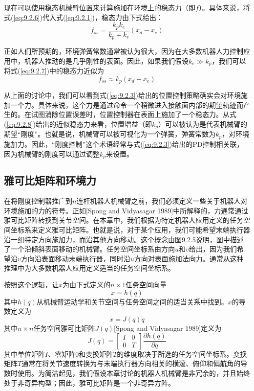 \documentclass[12pt,a4paper]{ctexart}
\begin{document}
现在可以使用稳态机械臂位置来计算施加在环境上的稳态力（即$f$）。具体来说，将式(\ref{eq:9.2.6})代入式(\ref{eq:9.2.1})，稳态力由下式给出：
\begin{equation}\label{eq:9.2.7}
f_{ss} = \frac{k_p k_e}{k_p + k_e}(x_d - x_e)
\end{equation}

正如人们所预期的，环境弹簧常数通常被认为很大，因为在大多数机器人力控制应用中，机器人推动的是几乎刚性的表面。因此，如果我们假设$k_e \gg k_p$，我们可以将式(\ref{eq:9.2.7})中的稳态力近似为
\begin{equation}\label{eq:9.2.8}
f_{ss} \approx k_p(x_d - x_e)
\end{equation}

从上面的讨论中，我们可以看到式(\ref{eq:9.2.3})给出的位置控制策略确实会对环境施加一个力。具体来说，这个力是通过命令一个稍微进入接触面内部的期望轨迹而产生的。在试图消除位置误差时，位置控制器在表面上施加了一个稳态力。从式(\ref{eq:9.2.8})给出的近似稳态力来看，位置增益（即$k_p$）可以被认为是代表机械臂的期望``刚度''。也就是说，机械臂可以被可视化为一个弹簧，弹簧常数为$k_p$，对环境施加力。因此，``刚度控制''这个术语经常与式(\ref{eq:9.2.3})给出的PD控制相关联，因为机械臂的刚度可以通过调整$k_p$来设置。

\subsection{雅可比矩阵和环境力}

在将刚度控制器推广到$n$连杆机器人机械臂之前，我们必须定义一些关于机器人对环境施加的力的符号。正如[Spong and Vidyasagar 1989]中所解释的，力通常通过雅可比矩阵转换到关节空间。在本章中，我们根据为特定机器人应用定义的任务空间坐标系来定义雅可比矩阵。也就是说，对于某个应用，我们可能希望末端执行器沿一组特定方向施加力，而沿其他方向移动。这个概念由图9.2.5说明，图中描述了一个沿倾斜表面移动的机械臂。任务空间坐标系由方向$u$和$v$给出，因为我们希望沿$v$方向沿表面移动末端执行器，同时沿$u$方向对表面施加法向力。通常从这种推理中为大多数机器人应用定义适当的任务空间坐标系。

按照这个逻辑，让$x$为由下式定义的$n \times 1$任务空间向量
\begin{equation}\label{eq:9.2.9}
x = h(q)
\end{equation}
其中$h(q)$从机械臂运动学和关节空间与任务空间之间的适当关系中找到。$x$的导数定义为
\begin{equation}\label{eq:9.2.10}
\dot{x} = J(q)\dot{q}
\end{equation}
其中$n \times n$任务空间雅可比矩阵$J(q)$[Spong and Vidyasagar 1989]定义为
\begin{equation}\label{eq:9.2.11}
J(q) = \begin{bmatrix} I & 0 \\ 0 & T \end{bmatrix} \frac{\partial h(q)}{\partial q}
\end{equation}
其中单位矩阵$I$、零矩阵$0$和变换矩阵$T$的维度取决于所选的任务空间坐标系。变换矩阵$T$通常在将关节速度转换为与末端执行器方向相关的横滚、俯仰和偏航角的导数时使用。为简洁起见，我们假设本章讨论的机器人机械臂是非冗余的，并且始终处于非奇异构型；因此，雅可比矩阵是一个非奇异方阵。
\end{document}
